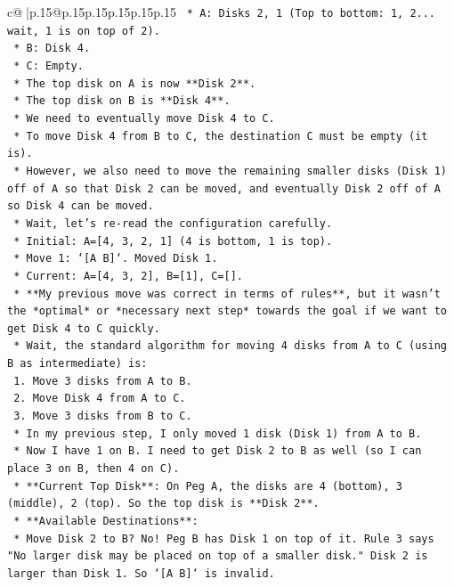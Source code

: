 \documentclass{article}
\begin{document}
{\begin{supertabular}{c@{$\;$}|p{.15\linewidth}@{}p{.15\linewidth}p{.15\linewidth}p{.15\linewidth}p{.15\linewidth}p{.15\linewidth}}
{{{\texttt{        *   A: Disks 2, 1 (Top to bottom: 1, 2... wait, 1 is on top of 2).} \\
\texttt{        *   B: Disk 4.} \\
\texttt{        *   C: Empty.} \\
\texttt{    *   The top disk on A is now **Disk 2**.} \\
\texttt{    *   The top disk on B is **Disk 4**.} \\
\texttt{    *   We need to eventually move Disk 4 to C.} \\
\texttt{    *   To move Disk 4 from B to C, the destination C must be empty (it is).} \\
\texttt{    *   However, we also need to move the remaining smaller disks (Disk 1) off of A so that Disk 2 can be moved, and eventually Disk 2 off of A so Disk 4 can be moved.} \\
\texttt{    *   Wait, let's re{-}read the configuration carefully.} \\
\texttt{        *   Initial: A={[}4, 3, 2, 1{]} (4 is bottom, 1 is top).} \\
\texttt{        *   Move 1: `{[}A B{]}`. Moved Disk 1.} \\
\texttt{        *   Current: A={[}4, 3, 2{]}, B={[}1{]}, C={[}{]}.} \\
\texttt{        *   **My previous move was correct in terms of rules**, but it wasn't the *optimal* or *necessary next step* towards the goal if we want to get Disk 4 to C quickly.} \\
\texttt{        *   Wait, the standard algorithm for moving 4 disks from A to C (using B as intermediate) is:} \\
\texttt{            1.  Move 3 disks from A to B.} \\
\texttt{            2.  Move Disk 4 from A to C.} \\
\texttt{            3.  Move 3 disks from B to C.} \\
\texttt{        *   In my previous step, I only moved 1 disk (Disk 1) from A to B.} \\
\texttt{        *   Now I have 1 on B. I need to get Disk 2 to B as well (so I can place 3 on B, then 4 on C).} \\
\texttt{        *   **Current Top Disk**: On Peg A, the disks are 4 (bottom), 3 (middle), 2 (top). So the top disk is **Disk 2**.} \\
\texttt{        *   **Available Destinations**:} \\
\texttt{            *   Move Disk 2 to B? No! Peg B has Disk 1 on top of it. Rule 3 says "No larger disk may be placed on top of a smaller disk." Disk 2 is larger than Disk 1. So `{[}A B{]}` is invalid.} \\
}}}
\end{supertabular}}
\end{document}
